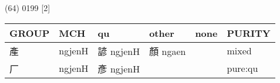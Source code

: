 \documentclass[14pt,a4paper]{scrartcl}
\begin{document}
(64) 0199 {[}2{]}

\begin{longtable}[c]{@{}llllll@{}}
\toprule
\begin{minipage}[b]{0.14\columnwidth}\raggedright\strut
GROUP
\strut\end{minipage} &
\begin{minipage}[b]{0.14\columnwidth}\raggedright\strut
MCH
\strut\end{minipage} &
\begin{minipage}[b]{0.14\columnwidth}\raggedright\strut
qu
\strut\end{minipage} &
\begin{minipage}[b]{0.14\columnwidth}\raggedright\strut
other
\strut\end{minipage} &
\begin{minipage}[b]{0.14\columnwidth}\raggedright\strut
none
\strut\end{minipage} &
\begin{minipage}[b]{0.14\columnwidth}\raggedright\strut
PURITY
\strut\end{minipage}\tabularnewline
\midrule
\endhead
\begin{minipage}[t]{0.14\columnwidth}\raggedright\strut
產
\strut\end{minipage} &
\begin{minipage}[t]{0.14\columnwidth}\raggedright\strut
ngjenH
\strut\end{minipage} &
\begin{minipage}[t]{0.14\columnwidth}\raggedright\strut
諺 ngjenH
\strut\end{minipage} &
\begin{minipage}[t]{0.14\columnwidth}\raggedright\strut
顏 ngaen
\strut\end{minipage} &
\begin{minipage}[t]{0.14\columnwidth}\raggedright\strut
\strut\end{minipage} &
\begin{minipage}[t]{0.14\columnwidth}\raggedright\strut
mixed
\strut\end{minipage}\tabularnewline
\begin{minipage}[t]{0.14\columnwidth}\raggedright\strut
厂
\strut\end{minipage} &
\begin{minipage}[t]{0.14\columnwidth}\raggedright\strut
ngjenH
\strut\end{minipage} &
\begin{minipage}[t]{0.14\columnwidth}\raggedright\strut
彥 ngjenH
\strut\end{minipage} &
\begin{minipage}[t]{0.14\columnwidth}\raggedright\strut
\strut\end{minipage} &
\begin{minipage}[t]{0.14\columnwidth}\raggedright\strut
\strut\end{minipage} &
\begin{minipage}[t]{0.14\columnwidth}\raggedright\strut
pure:qu
\strut\end{minipage}\tabularnewline
\bottomrule
\end{longtable}
\end{document}
